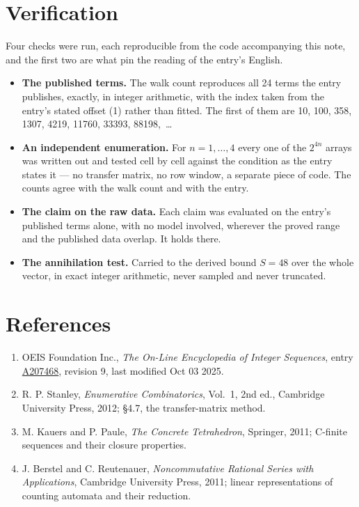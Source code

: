 \documentclass[11pt]{article}
\theoremstyle{definition}
\begin{document}
\section{Verification}

Four checks were run, each reproducible from the code accompanying this note, and the first two are what pin the reading of the entry's English.

\begin{itemize}

\item {\bfseries The published terms.} The walk count reproduces all 24 terms the entry publishes, exactly, in integer arithmetic, with the index taken from the entry's stated offset (1) rather than fitted. The first of them are 10, 100, 358, 1307, 4219, 11760, 33393, 88198,~\dots

\item {\bfseries An independent enumeration.} For $n = 1,\dots,4$ every one of the $2^{4n}$ arrays was written out and tested cell by cell against the condition as the entry states it --- no transfer matrix, no row window, a separate piece of code. The counts agree with the walk count and with the entry.

\item {\bfseries The claim on the raw data.} Each claim was evaluated on the entry's published terms alone, with no model involved, wherever the proved range and the published data overlap. It holds there.

\item {\bfseries The annihilation test.} Carried to the derived bound $S = 48$ over the whole vector, in exact integer arithmetic, never sampled and never truncated.

\end{itemize}

\section{References}

\begin{enumerate}

\item OEIS Foundation Inc., \emph{The On-Line Encyclopedia of Integer Sequences}, entry \href{https://oeis.org/A207468}{A207468}, revision 9, last modified Oct 03 2025.

\item R. P. Stanley, \emph{Enumerative Combinatorics}, Vol.~1, 2nd ed., Cambridge University Press, 2012; \S4.7, the transfer-matrix method.

\item M. Kauers and P. Paule, \emph{The Concrete Tetrahedron}, Springer, 2011; C-finite sequences and their closure properties.

\item J. Berstel and C. Reutenauer, \emph{Noncommutative Rational Series with Applications}, Cambridge University Press, 2011; linear representations of counting automata and their reduction.

\end{enumerate}
\end{document}
